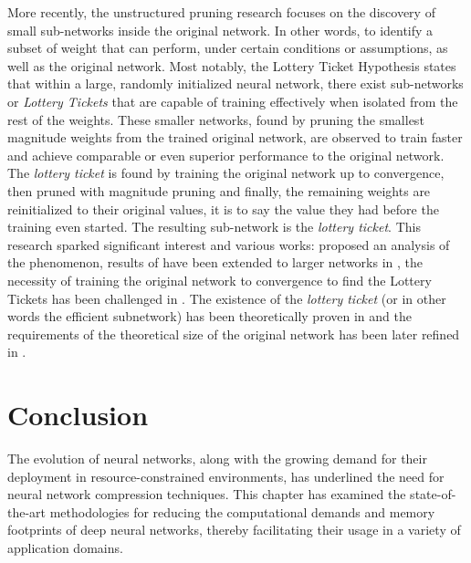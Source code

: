  More recently, the unstructured pruning research focuses on the discovery of
 small sub-networks inside the original network. In other words, to identify a
 subset of weight that can perform, under certain conditions or assumptions, as
 well as the original network. Most notably, the Lottery Ticket Hypothesis
 \cite{DBLP:conf/iclr/FrankleC19} states that within a large, randomly
 initialized neural network, there exist sub-networks or \emph{Lottery Tickets}
 that are capable of training effectively when isolated from the rest of the
 weights. These smaller networks, found by pruning the smallest magnitude
 weights from the trained original network, are observed to train faster and
 achieve comparable or even superior performance to the original network. The
 \emph{lottery ticket} is found by training the original network up to
 convergence, then pruned with magnitude pruning and finally, the remaining
 weights are reinitialized to their original values, it is to say the value they
 had before the training even started. The resulting sub-network is the
 \emph{lottery ticket}. This research sparked significant interest and various
 works: \cite{DBLP:conf/nips/ZhouLLY19} proposed an analysis of the phenomenon,
 results of \cite{DBLP:conf/iclr/FrankleC19} have been extended to larger
 networks in \cite{DBLP:journals/corr/abs-1903-01611}, the necessity of training
 the original network to convergence to find the Lottery Tickets has been
 challenged in \cite{DBLP:conf/iclr/LiuSZHD19}. The existence of the
 \emph{lottery ticket} (or in other words the efficient subnetwork) has been
 theoretically proven in \cite{DBLP:conf/icml/MalachYSS20} and the requirements
 of the theoretical size of the original network has been later refined in
 \cite{DBLP:conf/nips/PensiaRNVP20,DBLP:conf/nips/OrseauHR20}.\\

\section{Conclusion}



The evolution of neural networks, along with the growing demand for their
deployment in resource-constrained environments, has underlined the need for
neural network compression techniques. This chapter has examined the
state-of-the-art methodologies for reducing the computational demands and memory
footprints of deep neural networks, thereby facilitating their usage in a
variety of application domains.\\

